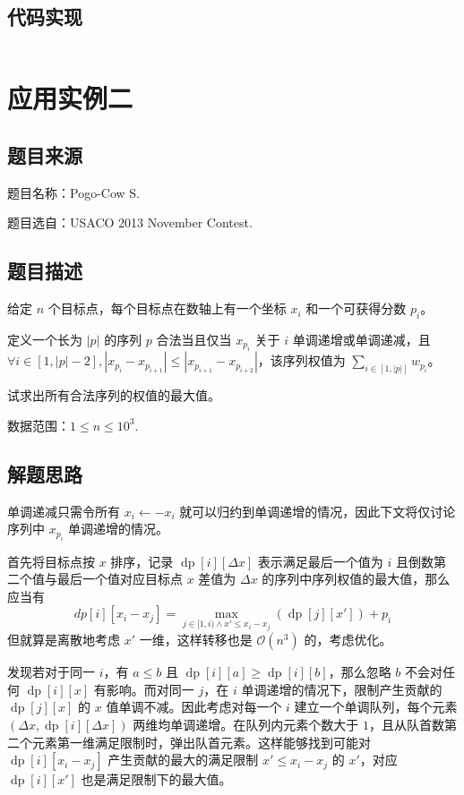 \subsection{代码实现}

\inputminted[frame=lines, numbers=left, fontsize=\scriptsize, tabsize=4, breaklines=true]{c++}{code/4.cpp}

\section{应用实例二}

\subsection{题目来源}

题目名称：Pogo-Cow S.

题目选自：USACO 2013 November Contest.

\subsection{题目描述}

给定 \(n\) 个目标点，每个目标点在数轴上有一个坐标 \(x_i\)
和一个可获得分数 \(p_i\)。

定义一个长为 \(|p|\) 的序列 \(p\) 合法当且仅当 \(x_{p_i}\) 关于 \(i\)
单调递增或单调递减，且
\(\forall i\in[1,|p|-2],|x_{p_i}-x_{p_{i+1}}|\le |x_{p_{i+1}}-x_{p_{i+2}}|\)，该序列权值为
\(\sum_{i\in[1,|p|]}w_{p_i}\)。

试求出所有合法序列的权值的最大值。

数据范围：\(1\le n\le 10^3\).

\subsection{解题思路}

单调递减只需令所有 \(x_i\leftarrow -x_i\)
就可以归约到单调递增的情况，因此下文将仅讨论序列中 \(x_{p_i}\)
单调递增的情况。

首先将目标点按 \(x\) 排序，记录 \(\operatorname{dp}[i][\Delta x]\)
表示满足最后一个值为 \(i\) 且倒数第二个值与最后一个值对应目标点 \(x\)
差值为 \(\Delta x\) 的序列中序列权值的最大值，那么应当有 \[
dp[i][x_i-x_j]=\max_{j\in[1,i)\land x'\le x_i-x_j}(\operatorname{dp}[j][x'])+p_i
\] 但就算是离散地考虑 \(x'\) 一维，这样转移也是 \(\mathcal{O}(n^3)\)
的，考虑优化。

发现若对于同一 \(i\)，有 \(a\le b\) 且
\(\operatorname{dp}[i][a]\ge \operatorname{dp}[i][b]\)，那么忽略 \(b\)
不会对任何 \(\operatorname{dp}[i][x]\) 有影响。而对同一 \(j\)，在 \(i\)
单调递增的情况下，限制产生贡献的 \(\operatorname{dp}[j][x]\) 的 \(x\)
值单调不减。因此考虑对每一个 \(i\) 建立一个单调队列，每个元素
\((\Delta x,\operatorname{dp}[i][\Delta x])\)
两维均单调递增。在队列内元素个数大于
\(1\)，且从队首数第二个元素第一维满足限制时，弹出队首元素。这样能够找到可能对
\(\operatorname{dp}[i][x_i-x_j]\) 产生贡献的最大的满足限制
\(x'\le x_i-x_j\) 的 \(x'\)，对应 \(\operatorname{dp}[i][x']\)
也是满足限制下的最大值。

